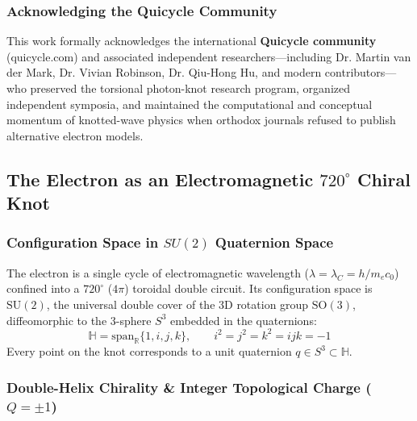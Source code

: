 \documentclass[11pt,a4paper]{article}
\begin{document}
\subsubsection{Acknowledging the Quicycle Community}
\label{subsubsec:quicycle_community}

This work formally acknowledges the international \textbf{Quicycle community} (quicycle.com) and associated independent researchers---including Dr. Martin van der Mark, Dr. Vivian Robinson, Dr. Qiu-Hong Hu, and modern contributors---who preserved the torsional photon-knot research program, organized independent symposia, and maintained the computational and conceptual momentum of knotted-wave physics when orthodox journals refused to publish alternative electron models.

\subsection{The Electron as an Electromagnetic \texorpdfstring{$720^\circ$}{720-Degree} Chiral Knot}
\label{subsec:electron_knot}

\subsubsection{Configuration Space in $SU(2)$ Quaternion Space}
\label{subsubsec:su2_quaternion}

The electron is a single cycle of electromagnetic wavelength ($\lambda = \lambda_C = h / m_e c_0$) confined into a $720^\circ$ ($4\pi$) toroidal double circuit. Its configuration space is $\text{SU}(2)$, the universal double cover of the 3D rotation group $\text{SO}(3)$, diffeomorphic to the 3-sphere $S^3$ embedded in the quaternions:
\begin{equation}
\mathbb{H} = \text{span}_{\mathbb{R}}\{1, i, j, k\}, \qquad i^2 = j^2 = k^2 = ijk = -1
\end{equation}
Every point on the knot corresponds to a unit quaternion $q \in S^3 \subset \mathbb{H}$.

\subsubsection{Double-Helix Chirality \& Integer Topological Charge ($Q = \pm 1$)}
\label{subsubsec:chiral_charge}
\end{document}
